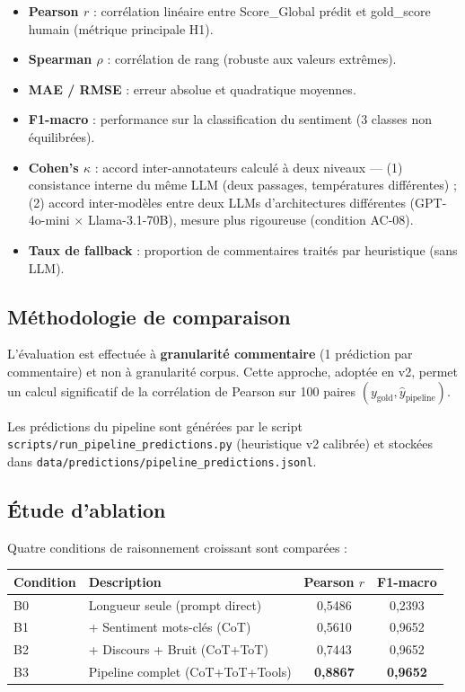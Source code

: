 \documentclass[12pt, a4paper]{article}
\begin{document}
\begin{itemize}
  \item \textbf{Pearson $r$} : corrélation linéaire entre Score\_Global prédit
        et gold\_score humain (métrique principale H1).
  \item \textbf{Spearman $\rho$} : corrélation de rang (robuste aux valeurs
        extrêmes).
  \item \textbf{MAE / RMSE} : erreur absolue et quadratique moyennes.
  \item \textbf{F1-macro} : performance sur la classification du sentiment
        (3 classes non équilibrées).
  \item \textbf{Cohen's $\kappa$} : accord inter-annotateurs calculé à deux niveaux ---
        (1) consistance interne du même LLM (deux passages, températures différentes) ;
        (2) accord inter-modèles entre deux LLMs d'architectures différentes
        (GPT-4o-mini $\times$ Llama-3.1-70B), mesure plus rigoureuse (condition AC-08).
  \item \textbf{Taux de fallback} : proportion de commentaires traités par
        heuristique (sans LLM).
\end{itemize}

\subsection{Méthodologie de comparaison}

L'évaluation est effectuée à \textbf{granularité commentaire} (1 prédiction par
commentaire) et non à granularité corpus. Cette approche, adoptée en v2, permet
un calcul significatif de la corrélation de Pearson sur 100 paires
$(y_{\text{gold}}, \hat{y}_{\text{pipeline}})$.

Les prédictions du pipeline sont générées par le script
\texttt{scripts/run\_pipeline\_predictions.py} (heuristique v2 calibrée) et
stockées dans \texttt{data/predictions/pipeline\_predictions.jsonl}.

\subsection{Étude d'ablation}

Quatre conditions de raisonnement croissant sont comparées :

\begin{center}
\begin{tabular}{llcc}
\toprule
Condition & Description & Pearson $r$ & F1-macro \\
\midrule
B0 & Longueur seule (prompt direct) & 0{,}5486 & 0{,}2393 \\
B1 & + Sentiment mots-clés (CoT)    & 0{,}5610 & 0{,}9652 \\
B2 & + Discours + Bruit (CoT+ToT)   & 0{,}7443 & 0{,}9652 \\
B3 & Pipeline complet (CoT+ToT+Tools) & \textbf{0{,}8867} & \textbf{0{,}9652} \\
\bottomrule
\end{tabular}
\end{center}
\end{document}
